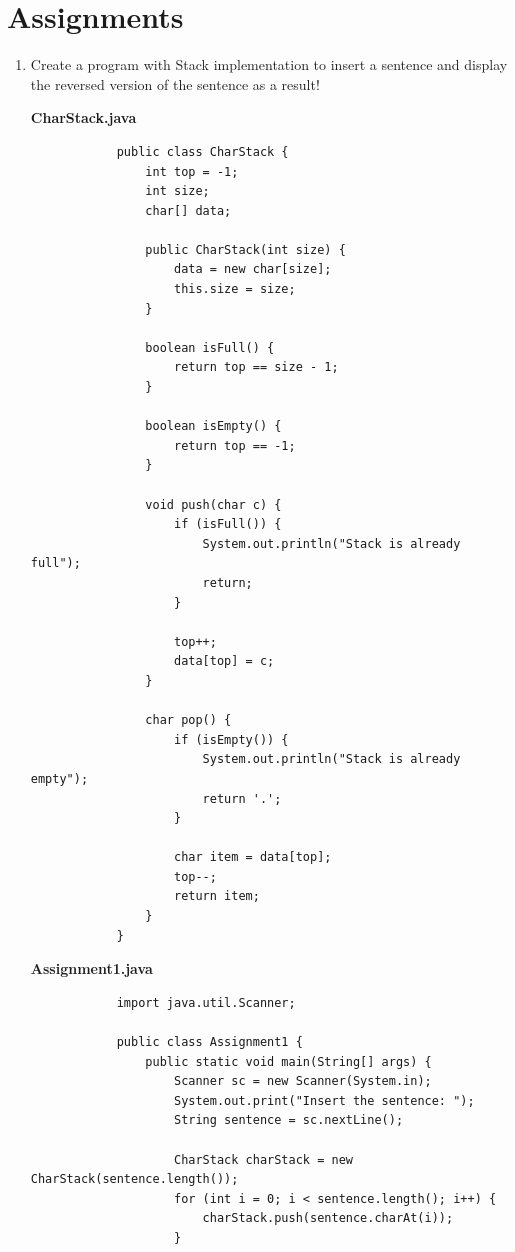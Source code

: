 \documentclass[12pt,titlepage]{article}
\begin{document}
\section{Assignments}
\begin{enumerate}
    \item {
        Create a program with Stack implementation to insert a sentence and display the reversed version of the sentence as a result!

        \textbf{CharStack.java}
        \begin{verbatim}
            public class CharStack {
                int top = -1;
                int size;
                char[] data;

                public CharStack(int size) {
                    data = new char[size];
                    this.size = size;
                }

                boolean isFull() {
                    return top == size - 1;
                }

                boolean isEmpty() {
                    return top == -1;
                }

                void push(char c) {
                    if (isFull()) {
                        System.out.println("Stack is already full");
                        return;
                    }

                    top++;
                    data[top] = c;
                }

                char pop() {
                    if (isEmpty()) {
                        System.out.println("Stack is already empty");
                        return '.';
                    }

                    char item = data[top];
                    top--;
                    return item;
                }
            }
        \end{verbatim}

        \textbf{Assignment1.java}
        \begin{verbatim}
            import java.util.Scanner;

            public class Assignment1 {
                public static void main(String[] args) {
                    Scanner sc = new Scanner(System.in);
                    System.out.print("Insert the sentence: ");
                    String sentence = sc.nextLine();

                    CharStack charStack = new CharStack(sentence.length());
                    for (int i = 0; i < sentence.length(); i++) {
                        charStack.push(sentence.charAt(i));
                    }


\end{verbatim}}
\end{enumerate}
\end{document}
